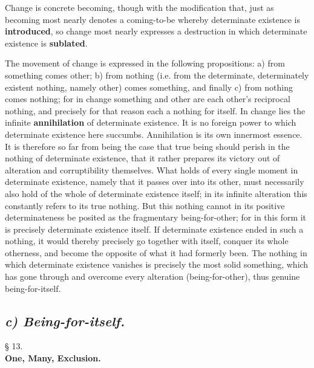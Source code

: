 \documentclass[12pt,a4paper,openany]{book}
\newcommand{\opage}[1]{\marginnote{\footnotesize\textit{[#1]}}}
\newcommand{\underafsnit}[1]{\subsection*{\centering\emph{#1}}\addcontentsline{toc}{subsection}{#1}}
\newcommand{\paragraf}[2]{\begin{center}§ #1.\\[0.2em]\textbf{#2}\end{center}}
\begin{document}
Change is concrete becoming, though with the
modification that, just as becoming most nearly denotes a
coming-to-be whereby determinate existence is \textbf{introduced}, so
change most nearly expresses a destruction in which
determinate existence is \textbf{sublated}.

The movement of change is expressed in the following propositions: a)
from something comes other; b) from nothing (i.e.
from the determinate, determinately existent nothing, namely other) comes
something, and finally c) from nothing comes nothing; for
in change something and other are each other's reciprocal
nothing, and precisely for that reason each a nothing for itself.
In change lies the infinite \textbf{annihilation} of determinate existence. It is no foreign power to which determinate existence here succumbs. Annihilation is its own
innermost essence. It is therefore so far from being the case that
true being should perish in the nothing of determinate existence, that it rather prepares its victory out of
alteration and corruptibility themselves. What
holds of every single moment in determinate existence, namely
that it passes over into its other, must necessarily
also hold of the whole of determinate existence itself; in its infinite
alteration this constantly refers to its true nothing. But this nothing cannot in its positive determinateness
be posited as the fragmentary being-for-other;
for in this form it is precisely determinate existence itself.
If determinate existence ended in such a nothing, it would thereby
precisely go together with itself, conquer its whole
\setcounter{footnote}{0}%
\opage{14}otherness, and become the opposite of what it had formerly
been. The nothing in which determinate existence vanishes is
precisely the most solid something, which has gone through
and overcome every alteration (being-for-other),
thus genuine being-for-itself.

\underafsnit{c) Being-for-itself.}
\paragraf{13}{One, Many, Exclusion.}
\end{document}
